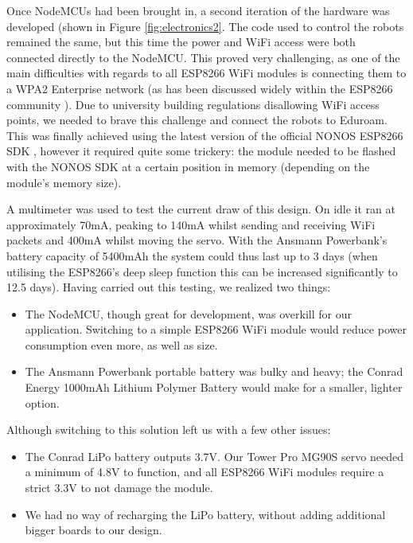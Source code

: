 \documentclass[onecolumn]{IEEEtran}
\begin{document}
        Once NodeMCUs had been brought in, a second iteration of the hardware was developed (shown in Figure \ref{fig:electronics2}. The code used to control the robots remained the same, but this time the power and WiFi access were both connected directly to the NodeMCU. This proved very challenging, as one of the main difficulties with regards to all ESP8266 WiFi modules is connecting them to a WPA2 Enterprise network (as has been discussed widely within the ESP8266 community \cite{wpa2}). Due to university building regulations disallowing WiFi access points, we needed to brave this challenge and connect the robots to Eduroam. This was finally achieved using the latest version of the official NONOS ESP8266 SDK \cite{nonos}, however it required quite some trickery: the module needed to be flashed with the NONOS SDK at a certain position in memory \cite{sdkstart} (depending on the module's memory size).
        
        A multimeter was used to test the current draw of this design. On idle it ran at approximately 70mA, peaking to 140mA whilst sending and receiving WiFi packets and 400mA whilst moving the servo. With the Ansmann Powerbank’s battery capacity of 5400mAh the system could thus last up to 3 days (when utilising the ESP8266’s deep sleep function \cite{deepsleep} this can be increased significantly to 12.5 days).
        {Having carried out this testing, we realized two things:}
            \begin{itemize}
                \item The NodeMCU, though great for development, was overkill for our application. Switching to a simple ESP8266 WiFi module would reduce power consumption even more, as well as size.
                \item The Ansmann Powerbank portable battery was bulky and heavy; the Conrad Energy 1000mAh Lithium Polymer Battery would make for a smaller, lighter option.
            \end{itemize}
        {Although switching to this solution left us with a few other issues:}
            \begin{itemize}
                \item The Conrad LiPo battery outputs 3.7V. Our Tower Pro MG90S servo needed a minimum of 4.8V to function, and all ESP8266 WiFi modules require a strict 3.3V to not damage the module.
                \item We had no way of recharging the LiPo battery, without adding additional bigger boards to our design.
            \end{itemize}
            
\end{document}
